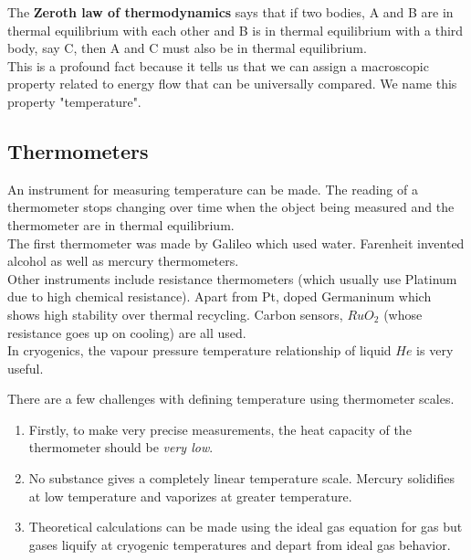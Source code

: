 \documentclass{article}
\begin{document}
	 The \textbf{Zeroth law of thermodynamics} says that if two bodies, A and B are in thermal equilibrium with each other and B is in thermal equilibrium with a third body, say C, then A and C must also be in thermal equilibrium.\\
	 This is a profound fact because it tells us that we can assign a macroscopic property related to energy flow that can be universally compared. We name this property "temperature".\\
	 
	 \subsection*{Thermometers}
	 An instrument for measuring temperature can be made. The reading of a thermometer stops changing over time when the object being measured and the thermometer are in thermal equilibrium.\\
	 The first thermometer was made by Galileo which used water. Farenheit invented alcohol as well as mercury thermometers.\\
	 
	 Other instruments include resistance thermometers (which usually use Platinum due to high chemical resistance). Apart from Pt, doped Germaninum which shows high stability over thermal recycling.
	 Carbon sensors, $RuO_2$ (whose resistance goes up on cooling) are all used.\\
	 In cryogenics, the vapour pressure \textendash temperature relationship of liquid $He$ is very useful.
	 
	 There are a few challenges with defining temperature using thermometer scales.
	 
	 \begin{enumerate}
	 	\item Firstly, to make very precise measurements, the heat capacity of the thermometer should be \textit{very low}.
	 	
	 	\item No substance gives a completely linear temperature scale. Mercury solidifies at low temperature and vaporizes at greater temperature.
	 	
	 	\item Theoretical calculations can be made using the ideal gas equation for gas but gases liquify at cryogenic temperatures and depart from ideal gas behavior.
	 \end{enumerate}
	 
	 
	 
\end{document}

